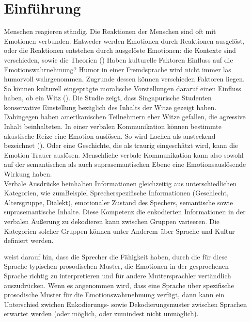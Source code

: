 \documentclass[11pt,a4paper,headsepline,twoside,toc=bibliography]{scrreprt}
\begin{document}
\chapter{Einführung}
\label{sec:einfuehrung}
Menschen reagieren ständig. Die Reaktionen der Menschen sind oft mit Emotionen verbunden. Entweder werden Emotionen durch Reaktionen ausgelöst, oder die Reaktionen entstehen durch ausgelöste Emotionen: die Kontexte sind verschieden, sowie die Theorien ()
Haben kulturelle Faktoren Einfluss auf die Emotionswahrnehmung? Humor in einer Fremdsprache wird nicht immer las humorvoll wahrgenommen. Zugrunde dessen können verschieden Faktoren liegen. So können kulturell eingeprägte moralische Vorstellungen dararuf einen Einfluss haben, ob ein Witz (\cite{Nevo2001}). Die Studie zeigt, dass Singapurische Studenten konservative Einstellung bezüglich des Inhalts der Witze gezeigt haben. Dahingegen haben amerikanischen Teilnehmern eher Witze gefallen, die agressive Inhalt beinhalteten. In einer verbalen Kommunikation können bestimmte akustische Reize eine Emotion auslösen. So wird Lachen als ansteckend bezeichnet (\cite{Provine1992}). Oder eine Geschichte, die als traurig eingeschätzt wird, kann die Emotion Trauer auslösen. Menschliche verbale Kommunikation kann also sowohl auf der semantischen als auch suprasemantischen Ebene eine Emotionsauslösende Wirkung haben.\\

Verbale Ausdrücke beinhalten Informationen gleichzeitig aus unterschiedlichen Kategorien, wie zumBeispiel Sprecherspezifische Informationen (Geschlecht, Altersgruppe, Dialekt), emotionaler Zustand des Spechers, semantische sowie suprasemantische Inhalte. Diese Kompetenz die enkodierten Informationen in der verbalen Äußerung zu dekodieren kann zwischen Gruppen varieeren. Die Kategorien solcher Gruppen können unter Anderem über Sprache und Kultur definiert werden.

\citeauthor{neuber2002prosodische} weist darauf hin, dass die Sprecher die Fähigkeit haben, durch die für diese Sprache typischen prosodischen Muster, die Emotionen in der gesprochenen Sprache richtig zu interpretieren und für andere Muttersprachler vertändlich auszudrücken. Wenn es angenommen wird, dass eine Sprache über spezifische prosodische Muster für die Emotionswahrnehmung verfügt, dann kann ein Unterschied zwichen Enkodierungs- sowie Dekodierungsmuster zwischen Sprachen erwartet werden (oder möglich, oder zumindest nicht unmöglich).   
\end{document}
